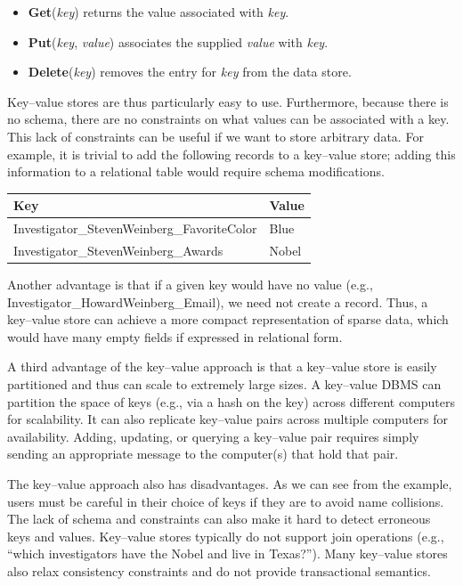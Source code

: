 \documentclass[]{krantz}
\begin{document}
\begin{itemize}
\item
  \textbf{Get}(\emph{key}) returns the value associated with \emph{key}.
\item
  \textbf{Put}(\emph{key}, \emph{value}) associates the supplied
  \emph{value} with \emph{key}.
\item
  \textbf{Delete}(\emph{key}) removes the entry for \emph{key} from the
  data store.
\end{itemize}

Key--value stores are thus particularly easy to use. Furthermore,
because there is no schema, there are no constraints on what values can
be associated with a key. This lack of constraints can be useful if we
want to store arbitrary data. For example, it is trivial to add the
following records to a key--value store; adding this information to a
relational table would require schema modifications.

\begin{longtable}[]{@{}ll@{}}
\toprule
\textbf{Key} & \textbf{Value}\tabularnewline
\midrule
\endhead
Investigator\_StevenWeinberg\_FavoriteColor & Blue\tabularnewline
Investigator\_StevenWeinberg\_Awards & Nobel\tabularnewline
\bottomrule
\end{longtable}

Another advantage is that if a given key would have no value (e.g.,
Investigator\_HowardWeinberg\_Email), we need not create a record. Thus,
a key--value store can achieve a more compact representation of sparse
data, which would have many empty fields if expressed in relational
form.

A third advantage of the key--value approach is that a key--value store
is easily partitioned and thus can scale to extremely large sizes. A
key--value DBMS can partition the space of keys (e.g., via a hash on the
key) across different computers for scalability. It can also replicate
key--value pairs across multiple computers for availability. Adding,
updating, or querying a key--value pair requires simply sending an
appropriate message to the computer(s) that hold that pair.

The key--value approach also has disadvantages. As we can see from the
example, users must be careful in their choice of keys if they are to
avoid name collisions. The lack of schema and constraints can also make
it hard to detect erroneous keys and values. Key--value stores typically
do not support join operations (e.g., ``which investigators have the
Nobel and live in Texas?''). Many key--value stores also relax
consistency constraints and do not provide transactional semantics.
\end{document}
